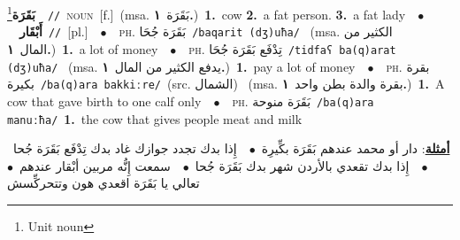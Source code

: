 \documentclass[10pt,a4paper,twoside]{article} %
\begin{document}
\begin{multicols}{2}
{\setlength\topsep{0pt}\textbf{\foreignlanguage{arabic}{بَقَرَة}}\footnote{Unit noun}\ \ {\color{gray}\texttt{//}\color{black}}\ \textsc{noun}\ [f.]\ \color{gray}(msa. \foreignlanguage{arabic}{بَقَرَة}~\foreignlanguage{arabic}{\textbf{١.}})\color{black}\ \textbf{1.}~cow  \textbf{2.}~a fat person.  \textbf{3.}~a fat lady\ \ $\bullet$\ \ \setlength\topsep{0pt}\textbf{\foreignlanguage{arabic}{أَبْقَار}}\ {\color{gray}\texttt{//}\color{black}}\ [pl.]\ \ $\bullet$\ \ \textsc{ph.} \color{gray} \foreignlanguage{arabic}{بَقَرَة جُحَا}\color{black}\ {\color{gray}\texttt{/{\sffamily baqarit (dʒ)uħa}/}\color{black}}\ \color{gray} (msa. \foreignlanguage{arabic}{الكثير من المال}~\foreignlanguage{arabic}{\textbf{١.}})\color{black}\ \textbf{1.}~a lot of money\ \ $\bullet$\ \ \textsc{ph.} \color{gray} \foreignlanguage{arabic}{تِدْفَع بَقَرَة جُحَا}\color{black}\ {\color{gray}\texttt{/{\sffamily tidfaʕ ba(q)arat (dʒ)uħa}/}\color{black}}\ \color{gray} (msa. \foreignlanguage{arabic}{يدفع الكثير من المال}~\foreignlanguage{arabic}{\textbf{١.}})\color{black}\ \textbf{1.}~pay a lot of money\ \ $\bullet$\ \ \textsc{ph.} \color{gray} \foreignlanguage{arabic}{بقرة بكيرة}\color{black}\ {\color{gray}\texttt{/{\sffamily ba(q)ara bakkiːre}/}\color{black}}\ \color{gray}(src. \foreignlanguage{arabic}{الشمال})\color{black}\ \color{gray} (msa. \foreignlanguage{arabic}{بقرة والدة بطن واحد}~\foreignlanguage{arabic}{\textbf{١.}})\color{black}\ \textbf{1.}~A cow that gave birth to one calf only\ \ $\bullet$\ \ \textsc{ph.} \color{gray} \foreignlanguage{arabic}{بَقَرَة منوحة}\color{black}\ {\color{gray}\texttt{/{\sffamily ba(q)ara manuːħa}/}\color{black}}\ \textbf{1.}~the cow that gives people meat and milk\  \begin{flushright}\color{gray}\foreignlanguage{arabic}{\textbf{\underline{\foreignlanguage{arabic}{أمثلة}}}: دار أو محمد عندهم بَقَرَة بكِّيرِة\ $\bullet$\ \  إِذا بدك تجدد جوازك غاد بدك تِدْفَع بَقَرَة جُحا\ $\bullet$\ \  إِذا بدك تقعدي بالأردن شهر بدك بَقَرَة جُحا\ $\bullet$\ \  سمعت إِنُّه مربين أبْقار عندهم\ $\bullet$\ \  تعالي يا بَقَرَة اقعدي هون وتتحركِّسش}\end{flushright}\color{black}} \vspace{2mm}


\end{multicols}
\end{document}
